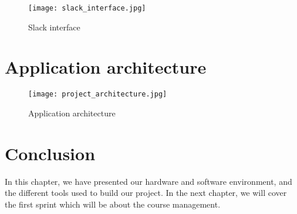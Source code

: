 \begin{figure}[!ht]
    \centering
    \texttt{[image: slack\_interface.jpg]}
    \caption{Slack interface}
    \label{fig:slack_interface}
\end{figure}


\section{Application architecture}

\vfill
\clearpage

\begin{figure}[!ht]
    \centering
    \texttt{[image: project\_architecture.jpg]}
    \caption{Application architecture}
    \label{fig:slack_interface}
\end{figure}



\section*{Conclusion}
In this chapter, we have presented our hardware and software environment, and the different tools used to build our project. In the next chapter, we will cover the first sprint which will be about the course management.